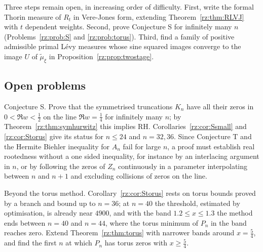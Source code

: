 Three steps remain open, in increasing order of difficulty. First, write the formal Thorin measure of $R_t$ in Vere-Jones form, extending Theorem~\ref{rz:thm:RLVJ} with $t$ dependent weights. Second, prove Conjecture S for infinitely many $n$ (Problems~\ref{rz:prob:S} and \ref{rz:prob:torus}). Third, find a family of positive admissible primal L\'evy measures whose sine squared images converge to the image $U$ of $\tilde\mu_\xi$ in Proposition~\ref{rz:prop:twostage}.

\subsection{Open problems}\label{rz:sec:open}

\begin{problem}\label{rz:prob:S}
Conjecture S. Prove that the symmetrised truncations $K_n$ have all their zeros in $0<\Re w<\frac12$ on the line $\Re w=\frac14$ for infinitely many $n$; by Theorem~\ref{rz:thm:symhurwitz} this implies RH. Corollaries~\ref{rz:cor:Ssmall} and \ref{rz:cor:Storus} give its status for $n\le24$ and $n=32,36$. Since Conjecture T and the Hermite Biehler inequality for $A_n$ fail for large $n$, a proof must establish real rootedness without a one sided inequality, for instance by an interlacing argument in $n$, or by following the zeros of $Z_n$ continuously in a parameter interpolating between $n$ and $n+1$ and excluding collisions of zeros on the line.
\end{problem}

\begin{problem}\label{rz:prob:torus}
Beyond the torus method. Corollary~\ref{rz:cor:Storus} rests on torus bounds proved by a branch and bound up to $n=36$; at $n=40$ the threshold, estimated by optimisation, is already near $4900$, and with the band $1.2\le x\le1.3$ the method ends between $n=40$ and $n=44$, where the torus minimum of $P_n$ in the band reaches zero. Extend Theorem~\ref{rz:thm:torus} with narrower bands around $x=\frac54$, and find the first $n$ at which $P_n$ has torus zeros with $x\ge\frac54$.
\end{problem}

